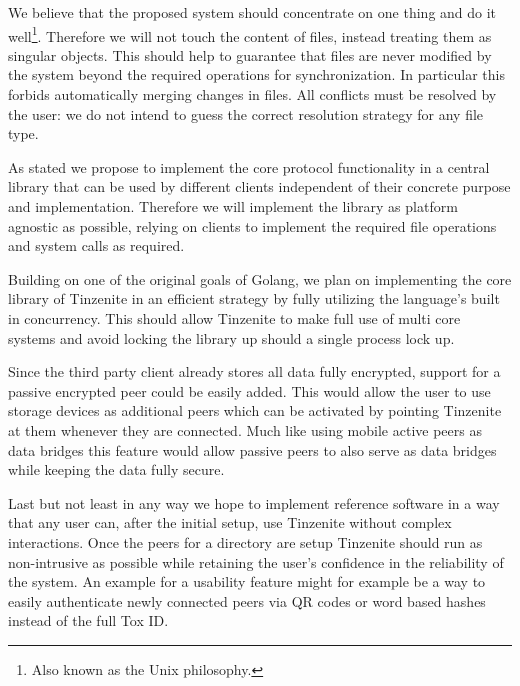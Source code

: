 \begin{description}[leftmargin=2em,style=nextline,noitemsep,nolistsep]
\item[Object Atomicity]
    We believe that the proposed system should concentrate on one thing and do it well\footnote{Also known as the Unix philosophy.}.
    Therefore we will not touch the content of files, instead treating them as singular objects.
    This should help to guarantee that files are never modified by the system beyond the required operations for synchronization.
    In particular this forbids automatically merging changes in files.
    All conflicts must be resolved by the user: we do not intend to guess the correct resolution strategy for any file type.
\item[Client Agnostic]
    As stated we propose to implement the core protocol functionality in a central library that can be used by different clients independent of their concrete purpose and implementation.
    Therefore we will implement the library as platform agnostic as possible, relying on clients to implement the required file operations and system calls as required.
\item[Concurrency]
    Building on one of the original goals of Golang, we plan on implementing the core library of Tinzenite in an efficient strategy by fully utilizing the language's built in concurrency.
    This should allow Tinzenite to make full use of multi core systems and avoid locking the library up should a single process lock up.
\item[Passive Peer]
    Since the third party client already stores all data fully encrypted, support for a passive encrypted peer could be easily added.
    This would allow the user to use storage devices as additional peers which can be activated by pointing Tinzenite at them whenever they are connected.
    Much like using mobile active peers as data bridges this feature would allow passive peers to also serve as data bridges while keeping the data fully secure.
\item[Usability]
    Last but not least in any way we hope to implement reference software in a way that any user can, after the initial setup, use Tinzenite without complex interactions.
    Once the peers for a directory are setup Tinzenite should run as non-intrusive as possible while retaining the user's confidence in the reliability of the system.
    An example for a usability feature might for example be a way to easily authenticate newly connected peers via QR codes or word based hashes instead of the full Tox ID.
\end{description}

